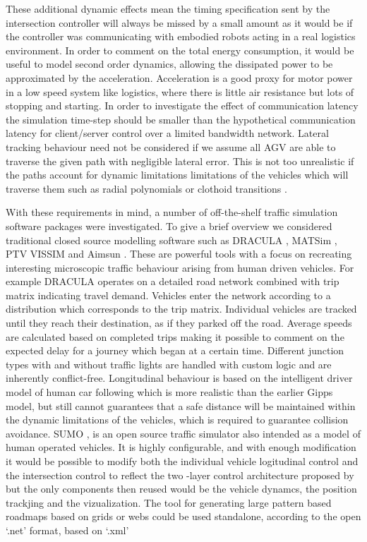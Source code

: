 These additional dynamic effects mean the timing specification sent by the intersection controller will always be missed by a small amount as it would be if the controller was communicating with embodied robots acting in a real logistics environment. In order to comment on the total energy consumption, it would be useful to model second order dynamics, allowing the dissipated power to be approximated by the acceleration. Acceleration is a good proxy for motor power in a low speed system like logistics, where there is little air resistance but lots of stopping and starting. In order to investigate the effect of communication latency the simulation time-step should be smaller than the hypothetical communication latency for client/server control over a limited bandwidth network. Lateral tracking behaviour need not be considered if we assume all AGV are able to traverse the given path with negligible lateral error. This is not too unrealistic if the paths account for dynamic limitations limitations of the vehicles which will traverse them such as radial polynomials \cite{Digani2014obs} or clothoid transitions \cite{lambertoptimalobstacles}.

With these requirements in mind, a number of off-the-shelf traffic simulation software packages were investigated. To give a brief overview we considered traditional closed source modelling software such as DRACULA \cite{Liu2005}, MATSim \cite{AndreasHorni2016}, PTV VISSIM \cite{Kara2014} and Aimsun \cite{lenorzer2015modelling}. These are powerful tools with a focus on recreating interesting microscopic traffic behaviour arising from human driven vehicles. For example DRACULA operates on a detailed road network combined with trip matrix indicating travel demand. Vehicles enter the network according to a distribution which corresponds to the trip matrix. Individual vehicles are tracked until they reach their destination, as if they parked off the road. Average speeds are calculated based on completed trips making it possible to comment on the expected delay for a journey which began at a certain time. Different junction types with and without traffic lights are handled with custom logic and are inherently conflict-free. Longitudinal behaviour is based on the intelligent driver model of human car following which is more realistic than the earlier Gipps model, but still cannot guarantees that a safe distance will be maintained within the dynamic limitations of the vehicles, which is required to guarantee collision avoidance. SUMO \cite{Busquets2016}, is an open source traffic simulator also intended as a model of human operated vehicles. It is highly configurable, and with enough modification it would be possible to modify both the  individual vehicle logitudinal control and the intersection control to reflect the two -layer control architecture proposed by \cite{Digani2015} but the only components then reused would be the vehicle dynamcs, the position trackjing and the vizualization. The tool for generating large pattern based roadmaps based on grids or webs could be used standalone, according to the open `.net' format, based on `.xml'

